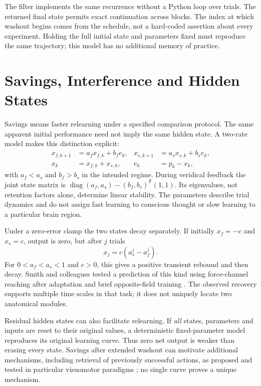 The filter implements the same recurrence without a Python loop over trials.
The returned final state permits exact continuation across blocks. The index at
which washout begins comes from the schedule, not a hard-coded assertion about
every experiment. Holding the full initial state and parameters fixed must
reproduce the same trajectory; this model has no additional memory of practice.

\section{Savings, Interference and Hidden States}

Savings means faster relearning under a specified comparison protocol. The
same apparent initial performance need not imply the same hidden state. A
two-rate model makes this distinction explicit:
\begin{align}
 x_{f,k+1}&=a_f x_{f,k}+b_f e_k, &
 x_{s,k+1}&=a_s x_{s,k}+b_s e_k,\\
 x_k&=x_{f,k}+x_{s,k}, &e_k&=p_k-x_k,
\end{align}
with $a_f<a_s$ and $b_f>b_s$ in the intended regime. During veridical feedback
the joint state matrix is
$\operatorname{diag}(a_f,a_s)-(b_f,b_s)^{\mathsf T}(1,1)$.
Its eigenvalues, not retention factors alone, determine linear stability.
The parameters describe trial dynamics and do not assign fast learning to
conscious thought or slow learning to a particular brain region.

Under a zero-error clamp the two states decay separately. If initially
$x_f=-c$ and $x_s=c$, output is zero, but after $j$ trials
\begin{equation}
 x_j=c(a_s^j-a_f^j).
\end{equation}
For $0<a_f<a_s<1$ and $c>0$, this gives a positive transient rebound and then
decay. Smith and colleagues tested a prediction of this kind using force-channel
reaching after adaptation and brief opposite-field training
\cite{SmithDualRate2006Review}. The observed recovery supports multiple time
scales in that task; it does not uniquely locate two anatomical modules.

Residual hidden states can also facilitate relearning. If \emph{all} states,
parameters and inputs are reset to their original values, a deterministic
fixed-parameter model reproduces its original learning curve. Thus zero net
output is weaker than erasing every state. Savings after extended washout can
motivate additional mechanisms, including retrieval of previously successful
actions, as proposed and tested in particular visuomotor paradigms
\cite{Huang2011}; no single curve proves a unique mechanism.

